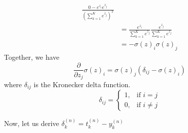 \begin{enumerate}[label=(\alph*)]
\begin{tcolorbox}[title={Solution}]
\begin{tcolorbox}[title={Derivative of Softmax}]
$$\begin{aligned}
					      \frac{0 - e^{z_i} e^{z_j}}{(\sum_{k =
					      1}^K e^{z_j})^2}                               \\
					                                               & =
					      \frac{e^{z_i}}{\sum_{k = 1}^K e^{z_j}}
					      \frac{e^{z_j}}{\sum_{k = 1}^K e^{z_j}}         \\
					                                               & = -
					      \sigma(z)_i
					      \sigma(z)_j
				      \end{aligned}
			      $$
			      Together, we have
			      $$
				      \frac{\partial}{\partial z_j}\sigma(z)_i = \sigma(z)_j
				      (\delta_{ij} - \sigma(z)_i)
			      $$
			      where $\delta_{ij}$ is the Kronecker delta function.
			      $$
				      \delta_{ij} =
				      \begin{cases}
					      1, & \text{if } i = j    \\
					      0, & \text{if } i \neq j
				      \end{cases}
			      $$
		      \end{tcolorbox}
	      \end{tcolorbox}
	      \begin{tcolorbox}

		      \begin{tcolorbox}[title={Output Layer Derivation}]
			      Now, let us derive $\delta_k^{(n)} = t_k^{(n)} - y_k^{(n)}$


\end{tcolorbox}
\end{tcolorbox}
\end{enumerate}
